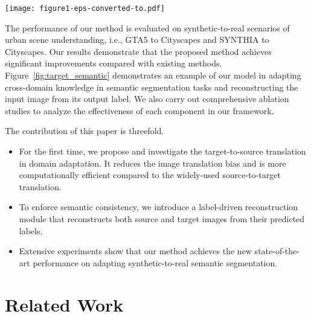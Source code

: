 \documentclass[runningheads]{llncs}
\begin{document}
\begin{figure*}[t]
		\begin{center}
\texttt{[image: figure1-eps-converted-to.pdf]}
		\end{center}
\caption{An example of our method on synthetic-to-real urban scene adaptation. Given a target-domain (or real) image (a), we first make target-to-source translation to obtain source-like (or synthetic) image (b), and then perform segmentation on these translated images. Our method improves the segmentation accuracy in the target domain by reconstructing both source and target images from their predicted labels (c). (d) illustrates the image reconstructed from (c), while (e) indicates the ground truth label.}
		\label{fig:target_semantic}
\end{figure*}
	


	The performance of our method is evaluated on synthetic-to-real scenarios of urban scene understanding, i.e., GTA5 to Cityscapes and SYNTHIA to Cityscapes. Our results demonstrate that the proposed method achieves significant improvements compared with existing methods. Figure~\ref{fig:target_semantic} demonstrates an example of our model in adapting cross-domain knowledge in semantic segmentation tasks and reconstructing the input image from its output label. We also carry out comprehensive ablation studies to analyze the effectiveness of each component in our framework.
	
	The contribution of this paper is threefold. 
	\begin{itemize}
	    \item For the first time, we propose and investigate the target-to-source translation in domain adaptation. It reduces the image translation bias and is more computationally efficient compared to the widely-used source-to-target translation.
	    \item To enforce semantic consistency, we introduce a label-driven reconstruction module that reconstructs both source and target images from their predicted labels.
	    \item Extensive experiments show that our method achieves the new state-of-the-art performance on adapting synthetic-to-real semantic segmentation.
	\end{itemize}



	\section{Related Work}
\end{document}
